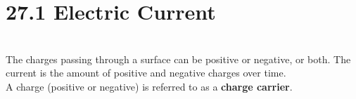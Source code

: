 \documentclass[12pt, titlepage, oneside]{article}
\begin{document}
\section*{27.1 Electric Current}
\noindent{}
\\

\noindent
The charges passing through a surface can be positive or negative, or both. The current is the amount of positive and negative charges over time.
\\
	
A charge (positive or negative) is referred to as a \textbf{charge carrier}.
\end{document}
